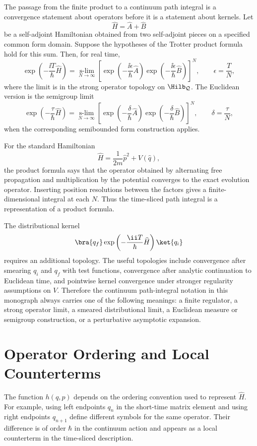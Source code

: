The passage from the finite product to a continuum path integral is a
convergence statement about operators before it is a statement about kernels.
Let
\[
  \widehat H=\widehat A+\widehat B
\]
be a self-adjoint Hamiltonian obtained from two self-adjoint pieces on a
specified common form domain.  Suppose the hypotheses of the Trotter product
formula hold for this sum.  Then, for real time,
\[
  \exp\left(-\frac{\ii T}{\hbar}\widehat H\right)
  =
  \operatorname*{s-lim}_{N\to\infty}
  \left[
    \exp\left(-\frac{\ii\epsilon}{\hbar}\widehat A\right)
    \exp\left(-\frac{\ii\epsilon}{\hbar}\widehat B\right)
  \right]^N,
  \qquad
  \epsilon=\frac{T}{N},
\]
where the limit is in the strong operator topology on \(\Hilb_{\mathcal Q}\).
The Euclidean version is the semigroup limit
\[
  \exp\left(-\frac{\tau}{\hbar}\widehat H\right)
  =
  \operatorname*{s-lim}_{N\to\infty}
  \left[
    \exp\left(-\frac{\delta}{\hbar}\widehat A\right)
    \exp\left(-\frac{\delta}{\hbar}\widehat B\right)
  \right]^N,
  \qquad
  \delta=\frac{\tau}{N},
\]
when the corresponding semibounded form construction applies.

For the standard Hamiltonian
\[
  \widehat H=\frac{1}{2m}\widehat p^2+V(\widehat q),
\]
the product formula says that the operator obtained by alternating free
propagation and multiplication by the potential converges to the exact
evolution operator.  Inserting position resolutions between the factors gives
a finite-dimensional integral at each \(N\).  Thus the time-sliced path
integral is a representation of a product formula.

The distributional kernel
\[
  \bra{q_f}\exp\left(-\frac{\ii T}{\hbar}\widehat H\right)\ket{q_i}
\]
requires an additional topology.  The useful topologies include convergence
after smearing \(q_i\) and \(q_f\) with test functions, convergence after
analytic continuation to Euclidean time, and pointwise kernel convergence
under stronger regularity assumptions on \(V\).  Therefore the continuum
path-integral notation in this monograph always carries one of the following
meanings: a finite regulator, a strong operator limit, a smeared
distributional limit, a Euclidean measure or semigroup construction, or a
perturbative asymptotic expansion.

\section{Operator Ordering and Local Counterterms}

The function \(h(q,p)\) depends on the ordering convention used to represent
\(\widehat H\). For example, using left endpoints \(q_n\) in the short-time
matrix element and using right endpoints \(q_{n+1}\) define different symbols
for the same operator. Their difference is of order \(\hbar\) in the
continuum action and appears as a local counterterm in the time-sliced
description.


